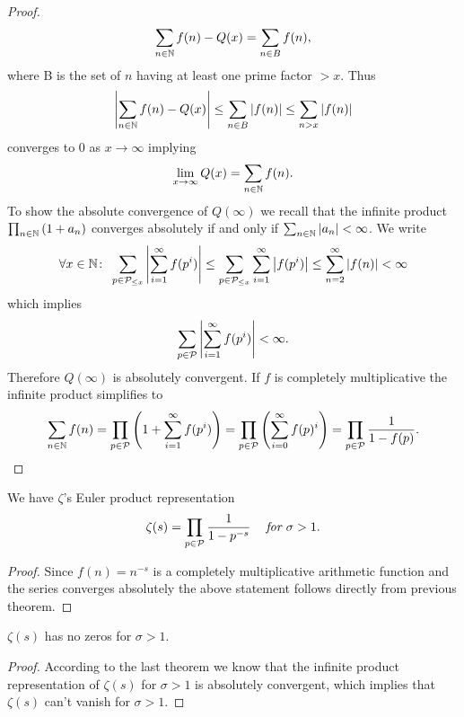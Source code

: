 \begin{proof}
\begin{equation*}
	\sum_{n \in \mathbb{N}} f(n)	 - Q(x) = \sum_{n \in B} f(n),
\end{equation*}
	where B is the set of $n$ having at least one prime factor $> x$. Thus
\begin{equation*}
	\left|\sum_{n \in \mathbb{N}} f(n) - Q(x)\right| \leq \sum_{n \in B} \left|f(n)\right| \leq \sum_{n > x} \left|f(n)\right|
\end{equation*}
	converges to $0$ as $x \to \infty$ implying
\begin{equation*}	
	\lim\limits_{x \to \infty} Q(x) = \sum_{n \in \mathbb{N}} f(n).
\end{equation*}
	To show the absolute convergence of $Q(\infty)$ we recall that the infinite product $\prod_{n \in \mathbb{N}} \left(1 + a_n\right)$ converges absolutely if and only if $\sum_{n \in \mathbb{N}} \left|a_n\right| < \infty$. We write
\begin{equation*}
	\forall x \in \mathbb{N} \colon \; \sum_{p \in \mathcal{P}_{\leq x}} \left|\sum_{i = 1}^\infty f(p^i)\right| \leq \sum_{p \in \mathcal{P}_{\leq x}} \sum_{i = 1}^\infty \left|f(p^i)\right| \leq \sum_{n = 2}^\infty \left|f(n)\right| < \infty
\end{equation*}
	which implies
\begin{equation*}
	\sum_{p \in \mathcal{P}} \left|\sum_{i = 1}^\infty f(p^i)\right| < \infty.
\end{equation*}
	Therefore $Q(\infty)$ is absolutely convergent. If $f$ is completely multiplicative the infinite product simplifies to
\begin{equation*}
	\sum_{n \in \mathbb{N}} f(n) = \prod_{p \in \mathcal{P}} \left(1 + \sum_{i = 1}^\infty f(p^i)\right) = \prod_{p \in \mathcal{P}} \left(\sum_{i = 0}^\infty f(p)^i\right) = \prod_{p \in \mathcal{P}} \frac{1}{1 - f(p)}.
\end{equation*}
\end{proof}


\begin{corollary}
	We have $\zeta$'s Euler product representation
\begin{equation*}
	\zeta(s) = \prod_{p \in \mathcal{P}} \frac{1}{1 - p^{-s}} \hspace{0.3cm} \textit{ for } \sigma > 1.
\end{equation*}
\end{corollary}
\begin{proof}
	Since $f(n) = n^{-s}$ is a completely multiplicative arithmetic function and the series converges absolutely the above statement follows directly from previous theorem.
\end{proof}


\begin{corollary}
	$\zeta(s)$ has no zeros for $\sigma > 1$.
\end{corollary}
\begin{proof}	
	According to the last theorem we know that the infinite product representation of $\zeta(s)$ for $\sigma > 1$ is absolutely convergent, which implies that $\zeta(s)$ can't vanish for $\sigma > 1$. 
\end{proof}